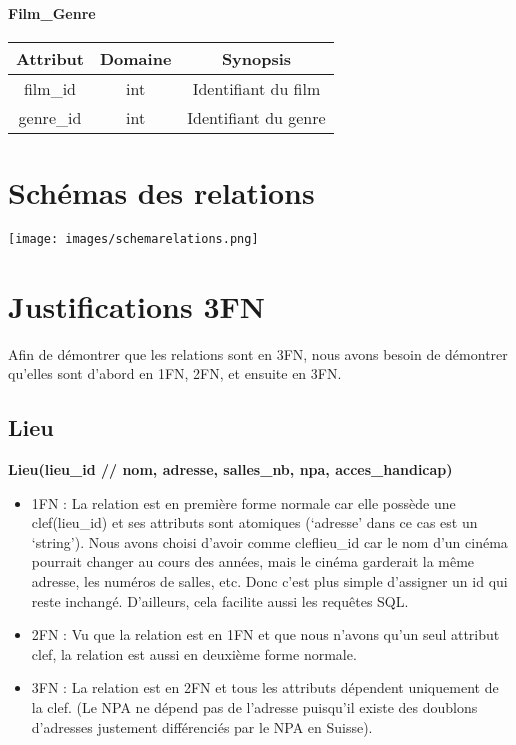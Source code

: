 \documentclass[12pt]{article}
\begin{document}
\paragraph*{Film{\_}Genre}
\begin{center}
    \begin{tabular}{||c c c||} 
     \hline
     Attribut & Domaine & Synopsis\\ [0.5ex] 
     \hline\hline
     {\color{blue}film\_id} & int & Identifiant du film \\ 
     \hline
     {\color{blue}genre{\_}id} & int & Identifiant du genre \\
     \hline
    \end{tabular}
\end{center}
\pagebreak
\section{Schémas des relations}
\texttt{[image: images/schemarelations.png]}
\pagebreak
\section{Justifications 3FN}
Afin de démontrer que les relations sont en 3FN, 
nous avons besoin de démontrer qu'elles sont d'abord en 1FN, 2FN, et ensuite en 3FN.
\subsection{Lieu}
\textbf{Lieu(lieu{\_}id // nom, adresse, salles{\_}nb, npa, acces{\_}handicap)}
\begin{itemize}
    \item 1FN : La relation est en première forme normale car elle possède une clef(lieu{\_}id) 
    et ses attributs sont atomiques (‘adresse’ dans ce cas est un ‘string’). 
    Nous avons choisi d’avoir comme cleflieu{\_}id car le nom d’un cinéma pourrait 
    changer au cours des années, mais le cinéma garderait la même adresse, les numéros de salles, etc. 
    Donc c’est plus simple d’assigner un id qui reste inchangé. D’ailleurs, cela facilite aussi les requêtes SQL.
    \item 2FN : Vu que la relation est en 1FN et que nous n'avons qu'un seul attribut clef, la relation est aussi
    en deuxième forme normale.
    \item 3FN : La relation est en 2FN et tous les attributs dépendent uniquement de la clef. (Le NPA ne dépend pas de l'adresse
    puisqu'il existe des doublons d'adresses justement différenciés par le NPA en Suisse).
\end{itemize}
\end{document}
